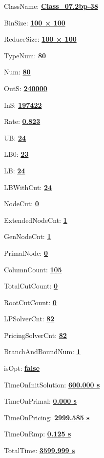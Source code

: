 \documentclass[11pt]{article}
\begin{document}
\pagestyle{empty}


ClassName: \underline{\textbf{Class_07.2bp-38}}
\par
BinSize: \underline{\textbf{100 × 100}}
\par
ReduceSize: \underline{\textbf{100 × 100}}
\par
TypeNum: \underline{\textbf{80}}
\par
Num: \underline{\textbf{80}}
\par
OutS: \underline{\textbf{240000}}
\par
InS: \underline{\textbf{197422}}
\par
Rate: \underline{\textbf{0.823}}
\par
UB: \underline{\textbf{24}}
\par
LB0: \underline{\textbf{23}}
\par
LB: \underline{\textbf{24}}
\par
LBWithCut: \underline{\textbf{24}}
\par
NodeCut: \underline{\textbf{0}}
\par
ExtendedNodeCnt: \underline{\textbf{1}}
\par
GenNodeCnt: \underline{\textbf{1}}
\par
PrimalNode: \underline{\textbf{0}}
\par
ColumnCount: \underline{\textbf{105}}
\par
TotalCutCount: \underline{\textbf{0}}
\par
RootCutCount: \underline{\textbf{0}}
\par
LPSolverCnt: \underline{\textbf{82}}
\par
PricingSolverCnt: \underline{\textbf{82}}
\par
BranchAndBoundNum: \underline{\textbf{1}}
\par
isOpt: \underline{\textbf{false}}
\par
TimeOnInitSolution: \underline{\textbf{600.000 s}}
\par
TimeOnPrimal: \underline{\textbf{0.000 s}}
\par
TimeOnPricing: \underline{\textbf{2999.585 s}}
\par
TimeOnRmp: \underline{\textbf{0.125 s}}
\par
TotalTime: \underline{\textbf{3599.999 s}}
\par
\newpage


\end{document}
